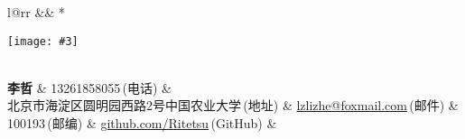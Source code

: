 \newcommand{\paint}[3]{
    \begin{minipage}{#1}
        \texttt{[image: \#3]}
    \end{minipage} 
}
\newcommand{\myheader}{
\begin{tabular*}{\textwidth}{l@{\extracolsep{\fill}}rr}
  && \multirow{4}*{\paint{2.5cm}{3.3cm}{./lz_new.jpg}}\\
  \specialrule{0em}{4pt}{4pt}
  \textbf{\LARGE 李哲} & 13261858055$\,${\color{labelgrey}(电话)} &\\
  北京市海淀区圆明园西路2号中国农业大学$\,${\color{labelgrey}(地址)} & \href{mailto:lzlizhe@foxmail.com}{lzlizhe@foxmail.com}$\,${\color{labelgrey}(邮件)} & \\
  100193$\,${\color{labelgrey}(邮编)} & \href{https://github.com/Ritetsu}{github.com/Ritetsu}$\,${\color{labelgrey}(GitHub)} & \\
  \end{tabular*}\\\vspace{0.1in}
}

\myheader

